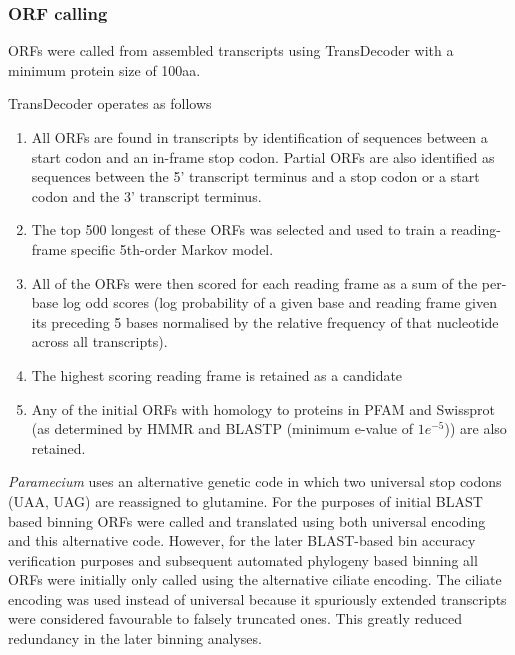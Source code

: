 \subsubsection{ORF calling}

ORFs were called from assembled transcripts using TransDecoder \citep{Haas2013} with 
a minimum protein size of 100aa.  


TransDecoder operates as follows
\begin{enumerate}
    \item All ORFs are found in transcripts by identification of sequences
        between a start codon and an in-frame stop codon. Partial ORFs are also
        identified as sequences between the 5' transcript terminus and a stop codon
        or a start codon and the 3' transcript terminus.
    \item The top 500 longest of these ORFs was selected and used to train a 
        reading-frame specific 5th-order Markov model.


    \item All of the ORFs were then scored for each reading frame
        as a sum of the per-base log odd scores
        (log probability of a given base and reading frame given its preceding
        5 bases normalised by the relative frequency of that nucleotide
        across all transcripts).
    \item The highest scoring reading frame is retained as a candidate
        
     \item Any of the initial ORFs with homology to proteins in PFAM and Swissprot (as determined by HMMR
        and BLASTP (minimum e-value of \(1e^{-5}\))) are also retained.
\end{enumerate}




\textit{Paramecium} uses an alternative
genetic code in which two universal stop codons (UAA, UAG) are reassigned to glutamine.
For the purposes of initial BLAST based binning ORFs were called and translated
using both universal encoding and this alternative code. However, for 
the later BLAST-based bin accuracy verification purposes and subsequent
automated phylogeny based binning all ORFs were initially only called using 
the alternative ciliate encoding. The ciliate encoding was used
instead of universal because it spuriously extended transcripts
were considered favourable to falsely truncated ones.
This greatly reduced redundancy in the later binning analyses.

